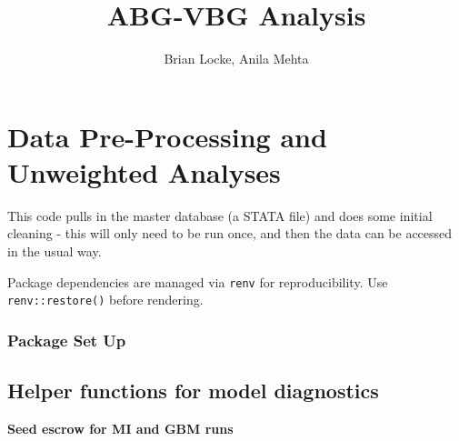 \documentclass[
  11pt,
  letterpaper,
  DIV=11,
  numbers=noendperiod]{scrartcl}
\title{ABG‑VBG Analysis}
\author{Brian Locke, Anila Mehta}
\date{}
\renewcommand*\contentsname{Table of contents}
\newcommand\contentsname{Table of contents}
\begin{document}
\maketitle

\renewcommand*\contentsname{Table of contents}
{
\hypersetup{linkcolor=}
\setcounter{tocdepth}{3}
\tableofcontents
}

\section{Data Pre-Processing and Unweighted
Analyses}\label{data-pre-processing-and-unweighted-analyses}

This code pulls in the master database (a STATA file) and does some
initial cleaning - this will only need to be run once, and then the data
can be accessed in the usual way.

Package dependencies are managed via \texttt{renv} for reproducibility.
Use \texttt{renv::restore()} before rendering.

\subsubsection{Package Set Up}\label{package-set-up}

\subsection{Helper functions for model
diagnostics}\label{helper-functions-for-model-diagnostics}

\begin{center}\textbf{Seed escrow for MI and GBM runs}\end{center}

\begin{table}[!h]
\centering\begingroup\fontsize{7}{9}\selectfont

\endgroup{}
\end{table}
\end{document}
